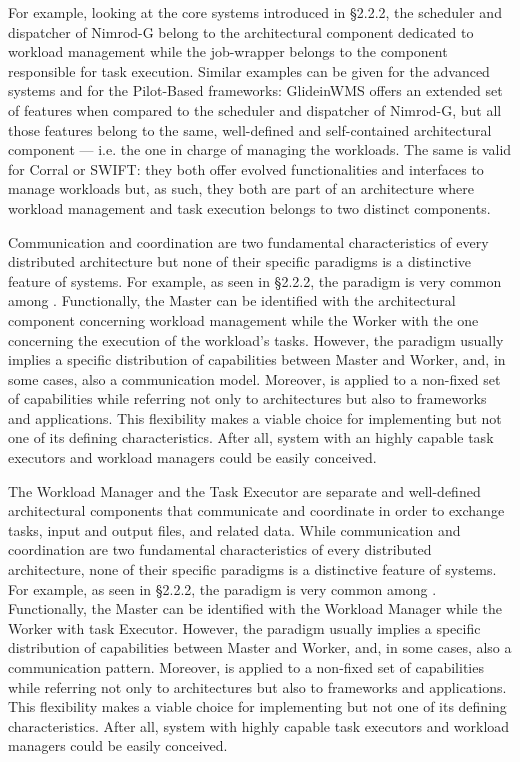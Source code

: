 \documentclass{sig-alternate}
\begin{document}
For example, looking at the core \pilotjob systems introduced in
\S2.2.2, the scheduler and dispatcher of Nimrod-G belong to the
architectural component dedicated to workload management while the
job-wrapper belongs to the component responsible for task
execution. Similar examples can be given for the advanced \pilotjob
systems and for the Pilot-Based frameworks: GlideinWMS offers an
extended set of features when compared to the scheduler and dispatcher
of Nimrod-G, but all those features belong to the same, well-defined
and self-contained architectural component --- i.e. the one in charge
of managing the workloads. The same is valid for Corral or SWIFT: they
both offer evolved functionalities and interfaces to manage workloads
but, as such, they both are part of an architecture where workload
management and task execution belongs to two distinct components.

Communication and coordination are two fundamental characteristics of
every distributed architecture but none of their specific paradigms is
a distinctive feature of \pilotjob systems. For example, as seen in
\S2.2.2, the \MW paradigm is very common among
\pilotjobs. Functionally, the Master can be identified with the
architectural component concerning workload management while the
Worker with the one concerning the execution of the workload's
tasks. However, the \MW paradigm usually implies a specific
distribution of capabilities between Master and Worker, and, in some
cases, also a communication model. Moreover, \MW is applied to a
non-fixed set of capabilities while referring not only to
architectures but also to frameworks and applications. This
flexibility makes \MW a viable choice for implementing \pilotjobs but
not one of its defining characteristics. After all, \pilotjobs system
with an highly capable task executors and workload managers could be
easily conceived.

The Workload Manager and the Task Executor are separate and
well-defined architectural components that communicate and coordinate
in order to exchange tasks, input and output files, and related
data. While communication and coordination are two fundamental
characteristics of every distributed architecture, none of their
specific paradigms is a distinctive feature of \pilotjob systems. For
example, as seen in \S2.2.2, the \MW paradigm is very common among
\pilotjobs. Functionally, the Master can be identified with the
Workload Manager while the Worker with task Executor. However, the \MW
paradigm usually implies a specific distribution of capabilities
between Master and Worker, and, in some cases, also a communication
pattern. Moreover, \MW is applied to a non-fixed set of capabilities
while referring not only to architectures but also to frameworks and
applications. This flexibility makes \MW a viable choice for
implementing \pilotjobs but not one of its defining
characteristics. After all, \pilotjobs system with highly capable task
executors and workload managers could be easily conceived.
\end{document}
